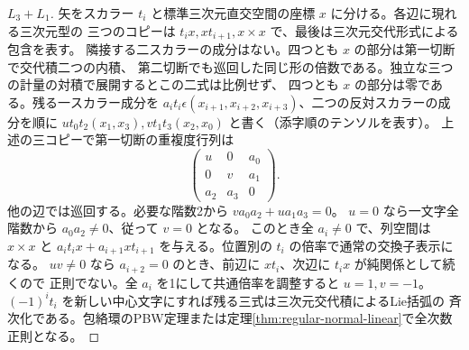 \begin{proof}[$L_3+L_1$]
矢をスカラー $t_i$ と標準三次元直交空間の座標 $x$ に分ける。各辺に現れる三次元型の
三つのコピーは $t_i x,x t_{i+1},x\times x$ で、最後は三次元交代形式による包含を表す。
隣接する二スカラーの成分はない。四つとも $x$ の部分は第一切断で交代積二つの内積、
第二切断でも巡回した同じ形の倍数である。独立な三つの計量の対積で展開するとこの二式は比例せず、
四つとも $x$ の部分は零である。残る一スカラー成分を
$a_i t_i\epsilon(x_{i+1},x_{i+2},x_{i+3})$、二つの反対スカラーの成分を順に
$u t_0t_2(x_1,x_3),v t_1t_3(x_2,x_0)$ と書く（添字順のテンソルを表す）。
上述の三コピーで第一切断の重複度行列は
\[
 \begin{pmatrix}u&0&a_0\\0&v&a_1\\a_2&a_3&0\end{pmatrix}.
\]
他の辺では巡回する。必要な階数2から $v a_0a_2+u a_1a_3=0$。
$u=0$ なら一文字全階数から $a_0a_2\ne0$、従って $v=0$ となる。
このとき全 $a_i\ne0$ で、列空間は $x\times x$ と
$a_i t_i x+a_{i+1}x t_{i+1}$ を与える。位置別の $t_i$ の倍率で通常の交換子表示になる。
$uv\ne0$ なら $a_{i+2}=0$ のとき、前辺に $x t_i$、次辺に $t_i x$ が純関係として続くので
正則でない。全 $a_i$ を1にして共通倍率を調整すると $u=1,v=-1$。
$(-1)^i t_i$ を新しい中心文字にすれば残る三式は三次元交代積によるLie括弧の
斉次化である。包絡環のPBW定理または定理\ref{thm:regular-normal-linear}で全次数正則となる。
\end{proof}

